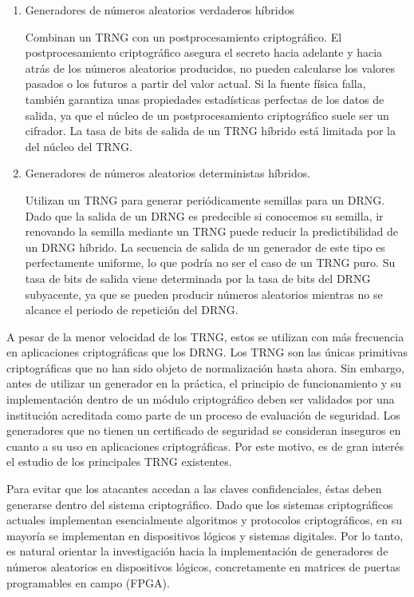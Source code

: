 	\begin{enumerate}
		\item Generadores de números aleatorios verdaderos híbridos
		
		Combinan un TRNG con un postprocesamiento criptográfico. El postprocesamiento criptográfico asegura el secreto hacia adelante y hacia atrás de los números aleatorios producidos, no pueden calcularse los valores pasados o los futuros a partir del valor actual. Si la fuente física falla, también garantiza unas propiedades estadísticas perfectas de los datos de salida, ya que el núcleo de un postprocesamiento criptográfico suele ser un cifrador. La tasa de bits de salida de un TRNG híbrido está limitada por la del núcleo del TRNG.
		
		\item Generadores de números aleatorios deterministas híbridos. 
		
		Utilizan un TRNG para generar periódicamente semillas para un DRNG. Dado que la salida de un DRNG es predecible si conocemos su semilla, ir renovando la semilla mediante un TRNG puede reducir la predictibilidad de un DRNG híbrido. La secuencia de salida de un generador de este tipo es perfectamente uniforme, lo que podría no ser el caso de un TRNG puro. Su tasa de bits de salida viene determinada por la tasa de bits del DRNG subyacente, ya que se pueden producir números aleatorios mientras no se alcance el periodo de repetición del DRNG.
	\end{enumerate}
		
	A pesar de la menor velocidad de los TRNG, estos se utilizan con más frecuencia en aplicaciones criptográficas que los DRNG. Los TRNG son las únicas primitivas criptográficas que no han sido objeto de normalización hasta ahora. Sin embargo, antes de utilizar un generador en la práctica, el principio de funcionamiento y su implementación dentro de un módulo criptográfico deben ser validados por una institución acreditada como parte de un proceso de evaluación de seguridad. Los generadores que no tienen un certificado de seguridad se consideran inseguros en cuanto a su uso en aplicaciones criptográficas. Por este motivo, es de gran interés el estudio de los principales TRNG existentes.
	
	Para evitar que los atacantes accedan a las claves confidenciales, éstas deben generarse dentro del sistema criptográfico. Dado que los sistemas criptográficos actuales implementan esencialmente algoritmos y protocolos criptográficos, en su mayoría se implementan en dispositivos lógicos y sistemas digitales. Por lo tanto, es natural orientar la investigación hacia la implementación de generadores de números aleatorios en dispositivos lógicos, concretamente en matrices de puertas programables en campo (FPGA).
	
